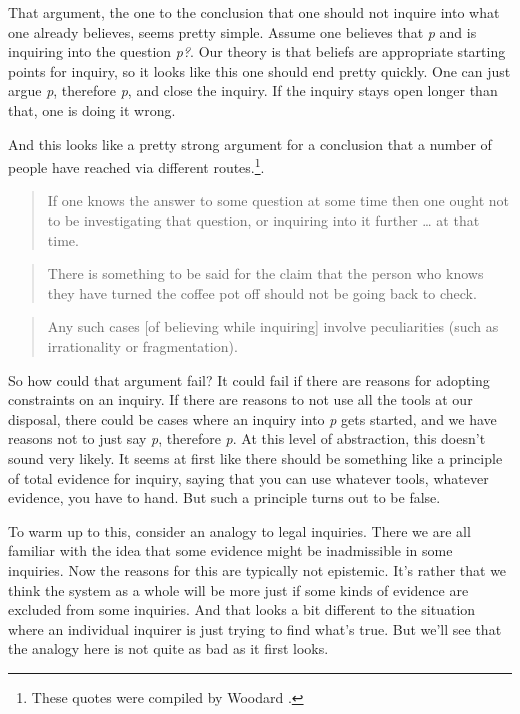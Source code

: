 \documentclass[
  11pt,
]{book}
\begin{document}
That argument, the one to the conclusion that one should not inquire into what one already believes, seems pretty simple. Assume one believes that \emph{p} and is inquiring into the question \emph{p?}. Our theory is that beliefs are appropriate starting points for inquiry, so it looks like this one should end pretty quickly. One can just argue \emph{p}, therefore \emph{p}, and close the inquiry. If the inquiry stays open longer than that, one is doing it wrong.

And this looks like a pretty strong argument for a conclusion that a number of people have reached via different routes.\footnote{These quotes were compiled by Woodard \citeyearpar{Woodard2021}.}.

\begin{quote}
If one knows the answer to some question at some time then one ought not to be investigating that question, or inquiring into it further \ldots{} at that time. \citep[131]{Friedman2017}
\end{quote}

\begin{quote}
There is something to be said for the claim that the person who knows they have turned the coffee pot off should not be going back to check. \citep[ ,587]{HawthorneStanley2008}
\end{quote}

\begin{quote}
Any such cases {[}of believing while inquiring{]} involve peculiarities (such as irrationality or fragmentation). \citep[ ,482n37]{McGrath2021}
\end{quote}

So how could that argument fail? It could fail if there are reasons for adopting constraints on an inquiry. If there are reasons to not use all the tools at our disposal, there could be cases where an inquiry into \emph{p} gets started, and we have reasons not to just say \emph{p}, therefore \emph{p}. At this level of abstraction, this doesn't sound very likely. It seems at first like there should be something like a principle of total evidence for inquiry, saying that you can use whatever tools, whatever evidence, you have to hand. But such a principle turns out to be false.

To warm up to this, consider an analogy to legal inquiries. There we are all familiar with the idea that some evidence might be inadmissible in some inquiries. Now the reasons for this are typically not epistemic. It's rather that we think the system as a whole will be more just if some kinds of evidence are excluded from some inquiries. And that looks a bit different to the situation where an individual inquirer is just trying to find what's true. But we'll see that the analogy here is not quite as bad as it first looks.
\end{document}
